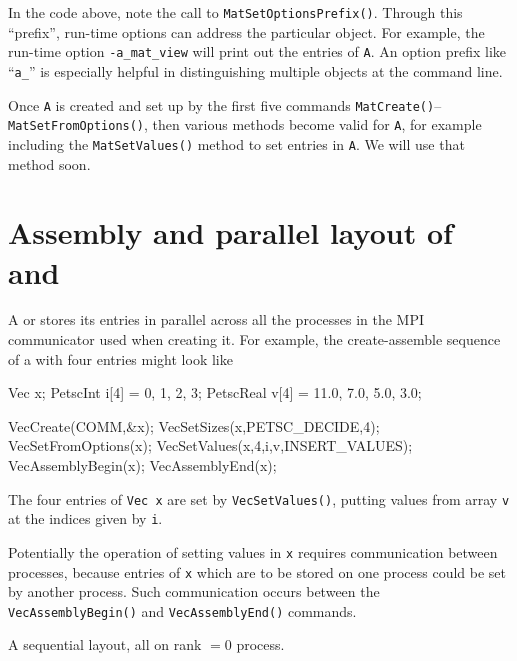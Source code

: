 In the \pMat code above, note the call to \texttt{MatSetOptionsPrefix()}.  Through this ``prefix'', run-time options can address the particular \pMat object.  For example, the run-time option \texttt{-a\_mat\_view} will print out the entries of \texttt{A}.  An option prefix like ``\texttt{a\_}'' is especially helpful in distinguishing multiple \pMat objects at the command line.

Once \pMat \texttt{A} is created and set up by the first five commands \texttt{MatCreate()}--\texttt{MatSetFromOptions()}, then various methods become valid for \texttt{A}, for example including the \texttt{MatSetValues()} method to set entries in \texttt{A}.  We will use that method soon.


\section{Assembly and parallel layout of \pVecs and \pMats}

A \pVec or \pMat stores its entries in parallel across all the processes in the MPI communicator used when creating it.  For example, the create-assemble sequence of a \pVec with four entries might look like
\begin{code}
Vec x;
PetscInt   i[4] = {0, 1, 2, 3};
PetscReal  v[4] = {11.0, 7.0, 5.0, 3.0};

VecCreate(COMM,&x);
VecSetSizes(x,PETSC_DECIDE,4);
VecSetFromOptions(x);
VecSetValues(x,4,i,v,INSERT_VALUES);
VecAssemblyBegin(x);
VecAssemblyEnd(x);
\end{code}
The four entries of \texttt{Vec x} are set by \texttt{VecSetValues()}, putting values from array \texttt{v} at the indices given by \texttt{i}.

Potentially the operation of setting values in \texttt{x} requires communication between processes, because entries of \texttt{x} which are to be stored on one process could be set by another process.  Such communication occurs between the \texttt{VecAssemblyBegin()} and \texttt{VecAssemblyEnd()} commands.

\begin{marginfigure}
\bigskip
\caption{A sequential \pVec layout, all on rank $=0$ process.}
\label{fig:seqveclayout}
\end{marginfigure}

